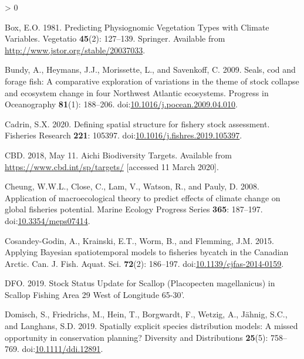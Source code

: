 \documentclass[
]{article}
\newlength{\cslhangindent}
\newenvironment{CSLReferences}[2] %
 {%
  \setlength{\parindent}{0pt}
  \ifodd #1 \everypar{\setlength{\hangindent}{\cslhangindent}}\ignorespaces\fi
  \ifnum #2 > 0
  \setlength{\parskip}{#2\baselineskip}
  \fi
 }%
 {}
\begin{document}
\begin{CSLReferences}{1}{0}
\leavevmode\hypertarget{ref-boxPredictingPhysiognomicVegetation1981}{}%
Box, E.O. 1981. Predicting {Physiognomic Vegetation Types} with {Climate Variables}. Vegetatio \textbf{45}(2): 127--139. {Springer}. Available from \url{http://www.jstor.org/stable/20037033}.

\leavevmode\hypertarget{ref-bundySealsCodForage2009}{}%
Bundy, A., Heymans, J.J., Morissette, L., and Savenkoff, C. 2009. Seals, cod and forage fish: {A} comparative exploration of variations in the theme of stock collapse and ecosystem change in four {Northwest Atlantic} ecosystems. Progress in Oceanography \textbf{81}(1): 188--206. doi:\href{https://doi.org/10.1016/j.pocean.2009.04.010}{10.1016/j.pocean.2009.04.010}.

\leavevmode\hypertarget{ref-cadrinDefiningSpatialStructure2020a}{}%
Cadrin, S.X. 2020. Defining spatial structure for fishery stock assessment. Fisheries Research \textbf{221}: 105397. doi:\href{https://doi.org/10.1016/j.fishres.2019.105397}{10.1016/j.fishres.2019.105397}.

\leavevmode\hypertarget{ref-cbdAichiBiodiversityTargets2018}{}%
CBD. 2018, May 11. Aichi {Biodiversity Targets}. Available from \url{https://www.cbd.int/sp/targets/} {[}accessed 11 March 2020{]}.

\leavevmode\hypertarget{ref-cheungApplicationMacroecologicalTheory2008}{}%
Cheung, W.W.L., Close, C., Lam, V., Watson, R., and Pauly, D. 2008. Application of macroecological theory to predict effects of climate change on global fisheries potential. Marine Ecology Progress Series \textbf{365}: 187--197. doi:\href{https://doi.org/10.3354/meps07414}{10.3354/meps07414}.

\leavevmode\hypertarget{ref-cosandey-godinApplyingBayesianSpatiotemporal2015}{}%
Cosandey-Godin, A., Krainski, E.T., Worm, B., and Flemming, J.M. 2015. Applying {Bayesian} spatiotemporal models to fisheries bycatch in the {Canadian Arctic}. Can. J. Fish. Aquat. Sci. \textbf{72}(2): 186--197. doi:\href{https://doi.org/10.1139/cjfas-2014-0159}{10.1139/cjfas-2014-0159}.

\leavevmode\hypertarget{ref-dfoStockStatusUpdate2019a}{}%
DFO. 2019. Stock {Status Update} for {Scallop} ({Placopecten} magellanicus) in {Scallop Fishing Area} 29 {West} of {Longitude} 65-30'.

\leavevmode\hypertarget{ref-domischSpatiallyExplicitSpecies2019}{}%
Domisch, S., Friedrichs, M., Hein, T., Borgwardt, F., Wetzig, A., Jähnig, S.C., and Langhans, S.D. 2019. Spatially explicit species distribution models: {A} missed opportunity in conservation planning? Diversity and Distributions \textbf{25}(5): 758--769. doi:\href{https://doi.org/10.1111/ddi.12891}{10.1111/ddi.12891}.


\end{CSLReferences}
\end{document}
